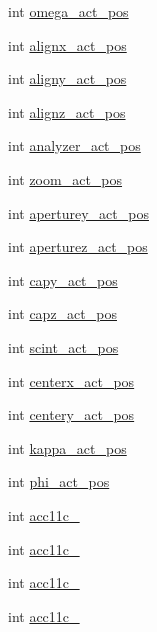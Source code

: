 \begin{DoxyCompactItemize}
\item 
int \hyperlink{structmd2StatusStruct_a6ce303bec89082cae1e9b1fddf6b6c10}{omega\_\-act\_\-pos}
\item 
int \hyperlink{structmd2StatusStruct_a9653a75bc0b66c5f86d8b0206dc39b4f}{alignx\_\-act\_\-pos}
\item 
int \hyperlink{structmd2StatusStruct_a0d40a01d2aa93c443526e826440f77fc}{aligny\_\-act\_\-pos}
\item 
int \hyperlink{structmd2StatusStruct_a480f892fe91b05b2980fb00064807e2b}{alignz\_\-act\_\-pos}
\item 
int \hyperlink{structmd2StatusStruct_a49d1151b0e819646587be0ca9c9d612a}{analyzer\_\-act\_\-pos}
\item 
int \hyperlink{structmd2StatusStruct_a920b80e9f5f08aedac3ad541d5ffc8ae}{zoom\_\-act\_\-pos}
\item 
int \hyperlink{structmd2StatusStruct_a2a434d2b57dbb669de0765486a1516ff}{aperturey\_\-act\_\-pos}
\item 
int \hyperlink{structmd2StatusStruct_a62d584ce23cfd9aa626d3c03649b455c}{aperturez\_\-act\_\-pos}
\item 
int \hyperlink{structmd2StatusStruct_ae25122a6db146501b51609b9cb59b044}{capy\_\-act\_\-pos}
\item 
int \hyperlink{structmd2StatusStruct_a257c04efac3a33d5d34b21d64c6f1266}{capz\_\-act\_\-pos}
\item 
int \hyperlink{structmd2StatusStruct_a1c146fc792c4285eed5b2c446c214f98}{scint\_\-act\_\-pos}
\item 
int \hyperlink{structmd2StatusStruct_ae7924b6e91e1de82f6f7910cb3a9c9bd}{centerx\_\-act\_\-pos}
\item 
int \hyperlink{structmd2StatusStruct_a6be71a92a599d490ca808af8c7e7faa0}{centery\_\-act\_\-pos}
\item 
int \hyperlink{structmd2StatusStruct_ac384fb7073387dd5dcb2e85a00ec8a77}{kappa\_\-act\_\-pos}
\item 
int \hyperlink{structmd2StatusStruct_a4de22995a72ff6e72a1a9ccab6d00620}{phi\_\-act\_\-pos}
\item 
int \hyperlink{structmd2StatusStruct_a69fc2e30a5de0a11c992d133e7a761cd}{acc11c\_}
\item 
int \hyperlink{structmd2StatusStruct_ad186f06cb4670b00b8af8264d1da66a4}{acc11c\_}
\item 
int \hyperlink{structmd2StatusStruct_a20a15620e12888f61c0aed1e47e97932}{acc11c\_}
\item 
int \hyperlink{structmd2StatusStruct_ab09c1342dc12052b8f5b35f78ef95000}{acc11c\_}

\end{DoxyCompactItemize}
